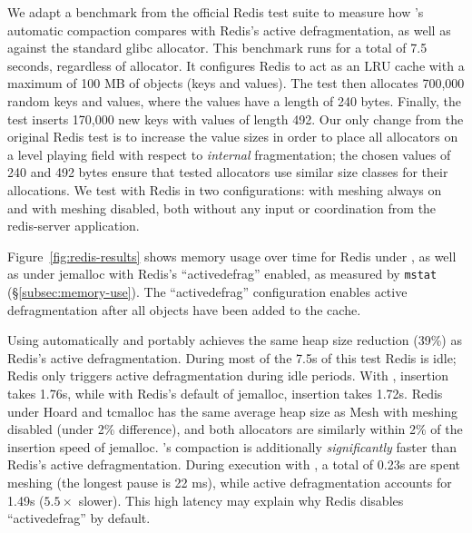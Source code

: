 
We adapt a benchmark from the official Redis test suite to measure how
\Mesh's automatic compaction compares with Redis's active
defragmentation, as well as against the standard glibc allocator. This
benchmark runs for a total of 7.5 seconds, regardless of allocator. It
configures Redis to act as an LRU cache with a maximum of 100 MB of
objects (keys and values).  The test then allocates 700,000 random
keys and values, where the values have a length of 240 bytes.
Finally, the test inserts 170,000 new keys with values of length 492.
Our only change from the original Redis test is to increase the value
sizes in order to place all allocators on a level playing field with
respect to \emph{internal} fragmentation; the chosen values of 240 and
492 bytes ensure that tested allocators use similar size classes for
their allocations. We test \Mesh with Redis in two configurations:
with meshing always on and with meshing disabled, both without any
input or coordination from the redis-server application.


Figure~\ref{fig:redis-results} shows memory usage over time for Redis
under \Mesh, as well as under jemalloc with Redis's
``activedefrag'' enabled, as measured by \texttt{mstat}
(\S\ref{subsec:memory-use}).  The ``activedefrag'' configuration
enables active defragmentation after all objects have been added to
the cache.

Using \Mesh automatically and portably achieves the same heap size
reduction (39\%) as Redis's active defragmentation.  During most of
the 7.5s of this test Redis is idle; Redis only triggers active
defragmentation during idle periods. With \Mesh, insertion takes
1.76s, while with Redis's default of jemalloc, insertion takes 1.72s.
Redis under Hoard and tcmalloc has the same average heap size as Mesh
with meshing disabled (under 2\% difference), and both allocators are
similarly within 2\% of the insertion speed of jemalloc.  \Mesh's
compaction is additionally \textit{significantly} faster than Redis's
active defragmentation. During execution with \Mesh{}, a total of
0.23s are spent meshing (the longest pause is 22 ms), while active
defragmentation accounts for 1.49s ($5.5\times$ slower). This high
latency may explain why Redis disables ``activedefrag'' by default.

